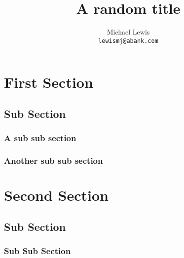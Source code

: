 \documentclass[twocolumn]{article}
\title{A random title}
\author{Michael Lewis\\
{\tt\small lewismj@abank.com}
}
\begin{document}
\maketitle

\begin{abstract}
\lipsum[1-1]
\end{abstract}

\tableofcontents

\section{First Section}
	\lipsum[1-2]
	\subsection{Sub Section}
		\subsubsection{A sub sub section}
			\lipsum[1-1]
	\subsubsection{Another sub sub section}
		\lipsum[1-1]
\section{Second Section}
	\subsection{Sub Section}
		\subsubsection{Sub Sub Section}
			\lipsum[1-5]
\end{document}
